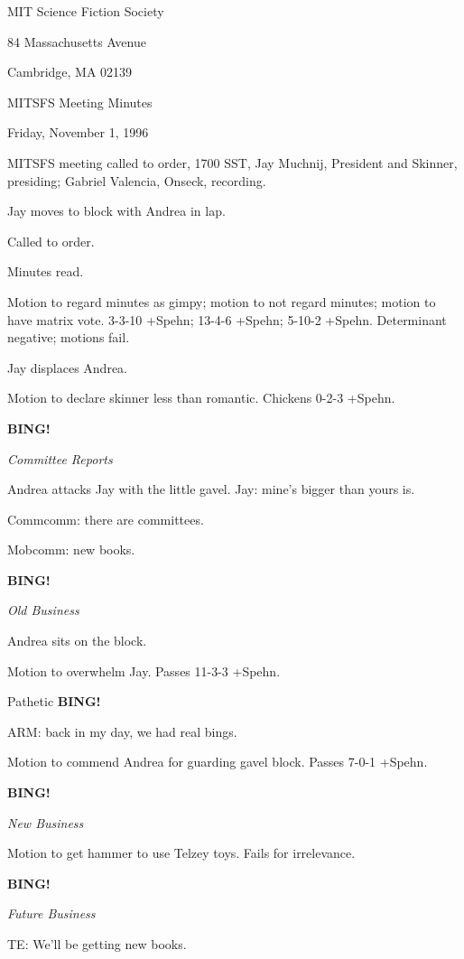 \documentclass[12pt]{article}
\newcommand{\bing}{{\bf BING!} }
\newcommand{\goto}[1]{\bing \vskip 12pt \centerline{{\em{#1}}}}
\begin{document}
\begin{center}

MIT Science Fiction Society 

84 Massachusetts Avenue

Cambridge, MA 02139

\vspace{12pt}

MITSFS Meeting Minutes 

Friday, November 1, 1996

\end{center}
 
\vspace{18pt}

\setlength{\parskip}{6pt}

\noindent
MITSFS meeting called to order, 1700 SST,
Jay Muchnij, President and Skinner, presiding; Gabriel Valencia, Onseck, recording.

Jay moves to block with Andrea in lap.

Called to order.

Minutes read.

Motion to regard minutes as gimpy; motion to not regard minutes; motion to have matrix vote. 3-3-10 +Spehn; 13-4-6 +Spehn; 5-10-2 +Spehn. Determinant negative; motions fail.

Jay displaces Andrea.

Motion to declare skinner less than romantic. Chickens 0-2-3 +Spehn.

\goto{Committee Reports}

Andrea attacks Jay with the little gavel. Jay: mine's bigger than yours is.

Commcomm: there are committees.

Mobcomm: new books.

\goto{Old Business}

Andrea sits on the block.

Motion to overwhelm Jay. Passes 11-3-3 +Spehn.

Pathetic \bing

ARM: back in my day, we had real bings.

Motion to commend Andrea for guarding gavel block. Passes 7-0-1 +Spehn.

\goto{New Business}

Motion to get hammer to use Telzey toys. Fails for irrelevance.

\goto{Future Business}

TE: We'll be getting new books.
\end{document}
